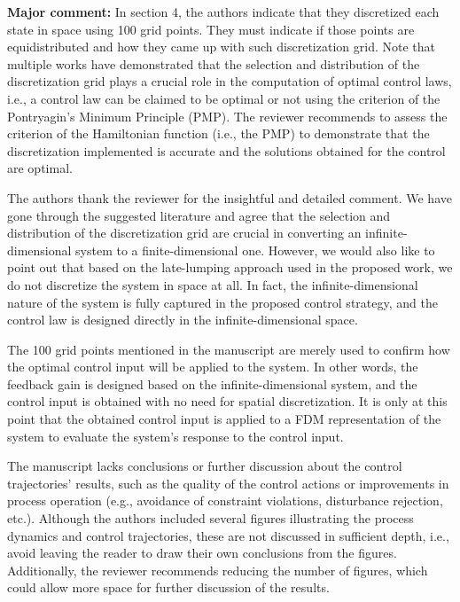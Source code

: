 \documentclass[11pt,answers]{exam}
\begin{document}
\begin{questions}

    \question \textbf{Major comment: } In section 4, the authors indicate that they discretized each state in space using 100 grid points. They must indicate if those points are equidistributed and how they came up with such discretization grid. Note that multiple works \cite{palma2023selection, assassa2016optimality, chen2014bilevel} have demonstrated that the selection and distribution of the discretization grid plays a crucial role in the computation of optimal control laws, i.e., a control law can be claimed to be optimal or not using the criterion of the Pontryagin's Minimum Principle (PMP). The reviewer recommends to assess the criterion of the Hamiltonian function (i.e., the PMP) to demonstrate that the discretization implemented is accurate and the solutions obtained for the control are optimal.

    \begin{solutionorbox} \label{comment:3_1}
        The authors thank the reviewer for the insightful and detailed comment. We have gone through the suggested literature and agree that the selection and distribution of the discretization grid are crucial in converting an infinite-dimensional system to a finite-dimensional one. However, we would also like to point out that based on the late-lumping approach used in the proposed work, we do not discretize the system in space at all. In fact, the infinite-dimensional nature of the system is fully captured in the proposed control strategy, and the control law is designed directly in the infinite-dimensional space.

        The 100 grid points mentioned in the manuscript are merely used to confirm how the optimal control input will be applied to the system. In other words, the feedback gain is designed based on the infinite-dimensional system, and the control input is obtained with no need for spatial discretization. It is only at this point that the obtained control input is applied to a FDM representation of the system to evaluate the system's response to the control input.
    \end{solutionorbox}


    \question The manuscript lacks conclusions or further discussion about the control trajectories' results, such as the quality of the control actions or improvements in process operation (e.g., avoidance of constraint violations, disturbance rejection, etc.). Although the authors included several figures illustrating the process dynamics and control trajectories, these are not discussed in sufficient depth, i.e., avoid leaving the reader to draw their own conclusions from the figures. Additionally, the reviewer recommends reducing the number of figures, which could allow more space for further discussion of the results.


\end{questions}
\end{document}
